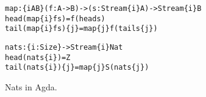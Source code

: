 \begin{figure}
\begin{alltt}
map : \{i A B\} (f : A -> B) -> (s : Stream \{i\} A) -> Stream \{i\} B
head (map \{i\} f s)     = f (head s)
tail (map \{i\} f s) \{j\} = map \{j\} f (tail s \{j\})

nats : \{i : Size\} -> Stream \{i\} Nat
head (nats \{i\})     = Z
tail (nats \{i\}) \{j\} = map \{j\} S (nats \{j\})
\end{alltt}
\caption{Nats in Agda.}
\label{fig:agda_nats}
\end{figure}